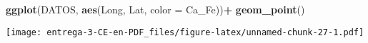 \documentclass[
]{article}
\newenvironment{Shaded}{\begin{snugshade}}{\end{snugshade}}
\newcommand{\DataTypeTok}[1]{\textcolor[rgb]{0.13,0.29,0.53}{#1}}
\newcommand{\DecValTok}[1]{\textcolor[rgb]{0.00,0.00,0.81}{#1}}
\newcommand{\KeywordTok}[1]{\textcolor[rgb]{0.13,0.29,0.53}{\textbf{#1}}}
\newcommand{\NormalTok}[1]{#1}
\newcommand{\OperatorTok}[1]{\textcolor[rgb]{0.81,0.36,0.00}{\textbf{#1}}}
\newcommand{\StringTok}[1]{\textcolor[rgb]{0.31,0.60,0.02}{#1}}
\begin{document}
\begin{Shaded}
\begin{Highlighting}[]
\KeywordTok{ggplot}\NormalTok{(DATOS, }\KeywordTok{aes}\NormalTok{(Long, Lat, }\DataTypeTok{color =}\NormalTok{ Ca_Fe))}\OperatorTok{+}
\StringTok{  }\KeywordTok{geom_point}\NormalTok{()}
\end{Highlighting}
\end{Shaded}

\texttt{[image: entrega-3-CE-en-PDF\_files/figure-latex/unnamed-chunk-27-1.pdf]}

\begin{Shaded}
\end{Shaded}
\end{document}
